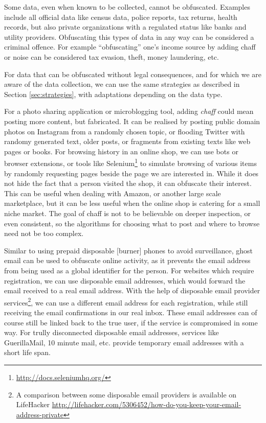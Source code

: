 \documentclass{IOS-Book-Article}     %
\newcommand{\tbox}[3][red]{{
\color{#1}\noindent{
   \fbox{\scriptsize{ {\bf #2} \textsl{#3}}}
   \vspace{2pt}
}
}}
\newcommand{\todo}[1]{\tbox{TODO:}{#1}}
\begin{document}
Some data, even when known to be collected, cannot be obfuscated. Examples 
include all official data like census data, police reports, tax returns, health 
records, but also private organizations with a regulated status like banks and 
utility providers. Obfuscating this types of data in any way can be considered 
a criminal offence. 
For example ``obfuscating'' one's income source by adding chaff or noise can be 
considered tax evasion, theft, money laundering, etc.

For data that can be obfuscated without legal consequences, and for 
which we are aware of the data collection, we can use the same 
strategies as described in Section \ref{sec:strategies}, with adaptations 
depending on the data type. 

For a photo sharing application or microblogging tool, adding \emph{chaff} 
could mean posting more content, but fabricated. 
It can be realised by posting public domain photos on Instagram from a randomly 
chosen topic, or flooding Twitter with randomy generated text, older posts, or 
fragments from existing texts like web pages or books. For browsing history in 
an online shop, we can use bots or browser extensions, or tools like Selenium\footnote{\url{http://docs.seleniumhq.org/}}
to simulate browsing of various items by randomly requesting 
pages beside the page we are interested in. While it does 
not hide the fact that a person visited the shop, it can obfuscate their interest. 
This can be useful when dealing with Amazon, or another large scale marketplace, 
but it can be less useful when the online shop is catering for a small niche 
market. 
The goal of chaff is not to be believable on deeper inspection, or even 
consistent, so the algorithms for choosing what to post and where to browse 
need not be too complex. 

Similar to using prepaid disposable [burner] phones to avoid surveillance, 
ghost email can be used to obfuscate online activity, as it prevents the email 
address from being used as a global identifier for the person. For websites which 
require registration, we can use disposable email addresses, which would 
forward the email received to a real email address. With 
the help of disposable email provider services\footnote{A comparison between 
some disposable email providers is available on LifeHacker 
\url{http://lifehacker.com/5306452/how-do-you-keep-your-email-address-private}}, 
we can use a different email address for each registration, while still 
receiving the email confirmations in our real inbox. These email addresses can 
of course still be linked back to the true user, if the service is compromised 
in some way. For trully disconnected disposable email addresses, services like 
GuerillaMail, 10 minute mail, etc. provide temporary email addresses with a 
short life span. 
\end{document}
